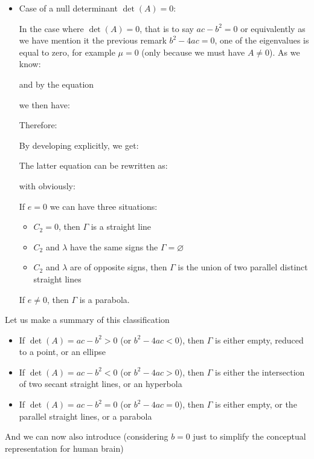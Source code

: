 \begin{itemize}
		\item Case of a null determinant $\det(A)=0$:
		
		In the case where $\det(A)=0$, that is to say $ac-b^2=0$ or equivalently as we have mention it the previous remark $b^2-4ac=0$, one of the eigenvalues is equal to zero, for example $\mu=0$ (only because we must have $A\neq 0$). As we know:
		
		and by the equation
		
		we then have:
		
		Therefore:
		
		By developing explicitly, we get:
		
		The latter equation can be rewritten as:
		
		with obviously:
		
		If $e=0$ we can have three situations:
		\begin{itemize}
			\item $C_2=0$, then $\Gamma$ is a straight line

			\item $C_2$ and $\lambda$ have the same signs the $\Gamma=\varnothing$

			\item $C_2$ and $\lambda$ are of opposite signs, then $\Gamma$ is the union of two parallel distinct straight lines
		\end{itemize}
		If $e\neq 0$, then $\Gamma$ is a parabola.
	\end{itemize}
	Let us make a summary of this classification\label{type of conics determinant}
	\begin{itemize}
		\item If $\det(A)=ac-b^2>0$ (or $b^2-4ac<0$), then $\Gamma$ is either empty, reduced to a point, or an ellipse

		\item If $\det(A)=ac-b^2<0$ (or $b^2-4ac>0$), then $\Gamma$ is either the intersection of two secant straight lines, or an hyperbola

			\item If $\det(A)=ac-b^2=0$ (or $b^2-4ac=0$), then $\Gamma$ is either empty, or the parallel straight lines, or a parabola
	\end{itemize}
	And we can now also introduce (considering $b=0$ just to simplify the conceptual representation for human brain)\label{type of conics matrix approach}
